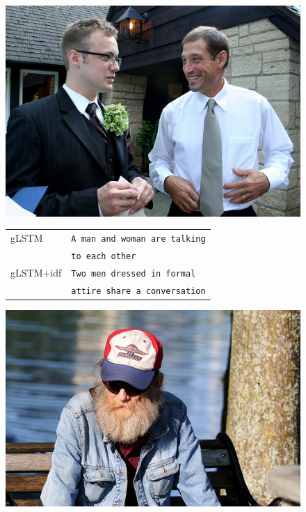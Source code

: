 \documentclass[twoside,twocolumn]{article}
\begin{document}
	\begin{figure}
		\centering
		\begin{minipage}[t]{.45\textwidth}
			\centering
			\vspace{0pt}
			\includegraphics[width=\textwidth]{Images/trouw}
		\end{minipage}\hfill	
		\begin{minipage}[t]{.7\textwidth}
			\vspace{0pt}
			\begin{tabular}{ll}
				gLSTM & \texttt{A man and woman are talking} \\ 
				~ & \texttt{to each other} \\
				gLSTM+idf & \texttt{Two men dressed in formal}\\
				~ & \texttt{attire share a conversation} \\
			\end{tabular}
		\end{minipage}
		\centering
		\begin{minipage}[t]{.45\textwidth}
			\centering
			\vspace{0pt}
			\includegraphics[width=\textwidth]{Images/441817653}

\end{minipage}
\end{figure}
\end{document}
